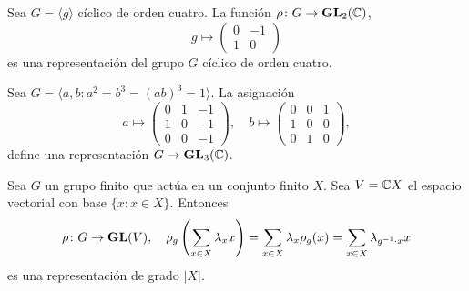 \begin{example}
Sea $G=\langle g\rangle$ cíclico de orden cuatro. 
La función $\rho\colon G\to\mathbf{GL}_2(\mathbb{C})$, 
\[
g\mapsto
\begin{pmatrix}
0&-1\\
1&0
\end{pmatrix}
\] 
es una representación del grupo $G$ cíclico de orden cuatro. 
\end{example}


\begin{example}
  Sea $G=\langle a,b:a^2=b^3=(ab)^3=1\rangle$. La asignación 
  \[
    a\mapsto\begin{pmatrix}
    0 & 1 & -1\\
    1 & 0 & -1\\
    0 & 0 & -1
    \end{pmatrix},
    \quad
    b\mapsto\begin{pmatrix}
      0 & 0 & 1\\
      1 & 0 & 0\\
      0 & 1 & 0
    \end{pmatrix},
  \]
  define una representación $G\to\mathbf{GL}_3(\mathbb{C})$. 
\end{example}


\begin{example}
  Sea $G$ un grupo finito que actúa en un conjunto finito $X$. 
  Sea $V=\mathbb{C} X$ el espacio vectorial con base $\{x:x\in
  X\}$. Entonces
  \[
	\rho\colon G\to\mathbf{GL}(V),\quad
	\rho_g\left(\sum_{x\in X}\lambda_x x\right)
	=\sum_{x\in X}\lambda_x\rho_g(x)
	=\sum_{x\in X}\lambda_{g^{-1}\cdot x}x
  \]
  es una representación de grado $|X|$.
\end{example}

